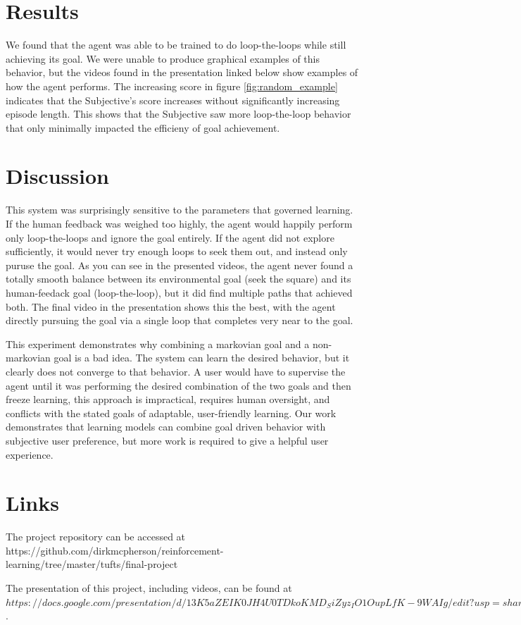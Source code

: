 \documentclass{article}
\begin{document}
\section{Results}

We found that the agent was able to be trained to do loop-the-loops while still achieving its goal. We were unable to produce graphical examples of this behavior, but the videos found in the presentation linked below show examples of how the agent performs. The increasing score in figure \ref{fig:random_example} indicates that the Subjective's score increases without significantly increasing episode length. This shows that the Subjective saw more loop-the-loop behavior that only minimally impacted the efficieny of goal achievement.

\section{Discussion}

This system was surprisingly sensitive to the parameters that governed learning. If the human feedback was weighed too highly, the agent would happily perform only loop-the-loops and ignore the goal entirely. If the agent did not explore sufficiently, it would never try enough loops to seek them out, and instead only puruse the goal. As you can see in the presented videos, the agent never found a totally smooth balance between its environmental goal (seek the square) and its human-feedack goal (loop-the-loop), but it did find multiple paths that achieved both. The final video in the presentation shows this the best, with the agent directly pursuing the goal via a single loop that completes very near to the goal.  

This experiment demonstrates why combining a markovian goal and a non-markovian goal is a bad idea. The system can learn the desired behavior, but it clearly does not converge to that behavior. A user would have to supervise the agent until it was performing the desired combination of the two goals and then freeze learning, this approach is impractical, requires human oversight, and conflicts with the stated goals of adaptable, user-friendly learning. Our work demonstrates that learning models can combine goal driven behavior with subjective user preference, but more work is required to give a helpful user experience.

\section{Links}

The project repository can be accessed at https://github.com/dirkmcpherson/reinforcement-learning/tree/master/tufts/final-project

The presentation of this project, including videos, can be found at $https://docs.google.com/presentation/d/13K5aZEIK0JH4U0TDkoKMD_SiZyz_IO1OupLfK-9WAIg/edit?usp=sharing$.



\end{document}
